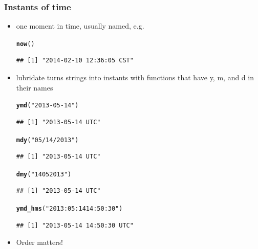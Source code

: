 \documentclass{beamer}\usepackage[]{graphicx}\usepackage[]{color}
\makeatletter
\newcommand{\hlstr}[1]{\textcolor[rgb]{0.192,0.494,0.8}{#1}}%
\newcommand{\hlstd}[1]{\textcolor[rgb]{0.345,0.345,0.345}{#1}}%
\newcommand{\hlkwd}[1]{\textcolor[rgb]{0.737,0.353,0.396}{\textbf{#1}}}%
\newenvironment{kframe}{%
 \def\at@end@of@kframe{}%
 \ifinner\ifhmode%
  \def\at@end@of@kframe{\end{minipage}}%
  \begin{minipage}{\columnwidth}%
 \fi\fi%
 \def\FrameCommand##1{\hskip\@totalleftmargin \hskip-\fboxsep
 \colorbox{shadecolor}{##1}\hskip-\fboxsep
     \hskip-\linewidth \hskip-\@totalleftmargin \hskip\columnwidth}%
 \MakeFramed {\advance\hsize-\width
   \@totalleftmargin\z@ \linewidth\hsize
   \@setminipage}}%
 {\par\unskip\endMakeFramed%
 \at@end@of@kframe}
\newenvironment{knitrout}{}{} %
\makeatother
\begin{document}
\begin{frame}[fragile]
\frametitle{Instants of time}
\begin{itemize}
\item one moment in time, usually named, e.g. 
\begin{knitrout}\footnotesize
{}\color{fgcolor}\begin{kframe}
\begin{alltt}
\hlkwd{now}\hlstd{()}
\end{alltt}
\begin{verbatim}
## [1] "2014-02-10 12:36:05 CST"
\end{verbatim}
\end{kframe}
\end{knitrout}

\item lubridate turns strings into instants with functions that have y, m, and d in their names
\begin{knitrout}\footnotesize
{}\color{fgcolor}\begin{kframe}
\begin{alltt}
\hlkwd{ymd}\hlstd{(}\hlstr{"2013-05-14"}\hlstd{)}
\end{alltt}
\begin{verbatim}
## [1] "2013-05-14 UTC"
\end{verbatim}
\begin{alltt}
\hlkwd{mdy}\hlstd{(}\hlstr{"05/14/2013"}\hlstd{)}
\end{alltt}
\begin{verbatim}
## [1] "2013-05-14 UTC"
\end{verbatim}
\begin{alltt}
\hlkwd{dmy}\hlstd{(}\hlstr{"14052013"}\hlstd{)}
\end{alltt}
\begin{verbatim}
## [1] "2013-05-14 UTC"
\end{verbatim}
\begin{alltt}
\hlkwd{ymd_hms}\hlstd{(}\hlstr{"2013:05:14 14:50:30"}\hlstd{)}
\end{alltt}
\begin{verbatim}
## [1] "2013-05-14 14:50:30 UTC"
\end{verbatim}
\end{kframe}
\end{knitrout}

\item Order matters!
\end{itemize}
\end{frame}
\end{document}
